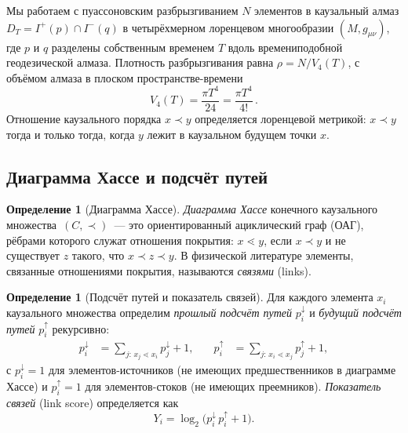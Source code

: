 \documentclass[12pt,a4paper]{article}
\theoremstyle{plain}
\theoremstyle{definition}
\newtheorem{definition}[theorem]{Определение}
\theoremstyle{remark}
\begin{document}
Мы работаем с пуассоновским разбрызгиванием $N$ элементов
в каузальный алмаз $D_T = I^+(p) \cap I^-(q)$ в
четырёхмерном лоренцевом многообразии
$(M, g_{\mu\nu})$, где $p$ и $q$ разделены собственным
временем $T$ вдоль времениподобной геодезической алмаза.
Плотность разбрызгивания равна $\rho = N/V_4(T)$, с
объёмом алмаза в плоском
пространстве-времени~\cite{GibbonsSolodukhin:2007}
\begin{equation}\label{eq:vol4}
  V_4(T) = \frac{\pi T^4}{24} = \frac{\pi T^4}{4!}\,.
\end{equation}
Отношение каузального порядка $x \prec y$ определяется
лоренцевой метрикой: $x \prec y$ тогда и только тогда,
когда $y$ лежит в каузальном будущем точки $x$.

\subsection{Диаграмма Хассе и подсчёт путей}

\begin{definition}[Диаграмма Хассе]
\label{def:hasse}
\emph{Диаграмма Хассе} конечного каузального
множества~$(C,\prec)$~--- это ориентированный
ациклический граф (ОАГ), рёбрами которого служат
отношения покрытия: $x \lessdot y$, если $x \prec y$
и не существует $z$ такого, что
$x \prec z \prec y$.  В физической литературе элементы,
связанные отношениями покрытия, называются \emph{связями}
(links).
\end{definition}

\begin{definition}[Подсчёт путей и показатель связей]
\label{def:pathcounts}
Для каждого элемента $x_i$ каузального множества определим
\emph{прошлый подсчёт путей} $p_i^{\downarrow}$ и
\emph{будущий подсчёт путей} $p_i^{\uparrow}$ рекурсивно:
\begin{align}\label{eq:pathcounts}
  p_i^{\downarrow}
  &= \sum_{j:\, x_j \lessdot x_i} p_j^{\downarrow} + 1,
  &\quad
  p_i^{\uparrow}
  &= \sum_{j:\, x_i \lessdot x_j} p_j^{\uparrow} + 1,
\end{align}
с $p_i^{\downarrow} = 1$ для элементов-источников
(не имеющих предшественников в диаграмме Хассе) и
$p_i^{\uparrow} = 1$ для элементов-стоков (не имеющих
преемников).  \emph{Показатель связей} (link score)
определяется как
\begin{equation}\label{eq:link-score}
  Y_i = \log_2\!\bigl(p_i^{\downarrow}\, p_i^{\uparrow} + 1\bigr).
\end{equation}
\end{definition}
\end{document}

